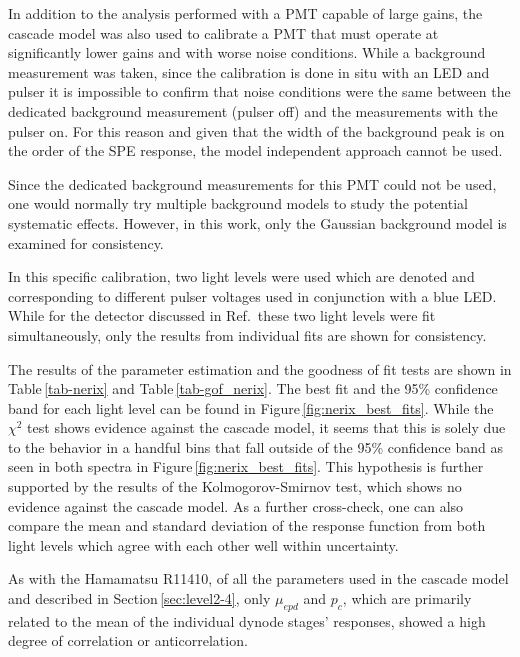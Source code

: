 \documentclass[11pt,a4paper]{article}
\newcommand\figref[1]{Figure\,\ref{#1}}
\newcommand\tabref[1]{Table\,\ref{#1}}
\newcommand\secref[1]{Section\,\ref{#1}}
\newcommand\citeref[1]{Ref.\,\cite{#1}}
\newcommand{\RNum}[1]{\uppercase\expandafter{\romannumeral #1\relax}}
\begin{document}
In addition to the analysis performed with a PMT capable of large gains, the cascade model was also used to calibrate a PMT that must operate at significantly lower gains and with worse noise conditions.  While a background measurement was taken, since the calibration is done in situ with an LED and pulser it is impossible to confirm that noise conditions were the same between the dedicated background measurement (pulser off) and the measurements with the pulser on.  For this reason and given that the width of the background peak is on the order of the SPE response, the model independent approach cannot be used.  





Since the dedicated background measurements for this PMT could not be used, one would normally try multiple background models to study the potential systematic effects.  However, in this work, only the Gaussian background model is examined for consistency.

In this specific calibration, two light levels were used which are denoted \RNum{1} and \RNum{2} corresponding to different pulser voltages used in conjunction with a blue LED.  While for the detector discussed in \citeref{goetzke} these two light levels were fit simultaneously, only the results from individual fits are shown for consistency.

The results of the parameter estimation and the goodness of fit tests are shown in \tabref{tab-nerix} and \tabref{tab-gof_nerix}.  The best fit and the 95\% confidence band for each light level can be found in \figref{fig:nerix_best_fits}.  While the $\chi^2$ test shows evidence against the cascade model, it seems that this is solely due to the behavior in a handful bins that fall outside of the 95\% confidence band as seen in both spectra in \figref{fig:nerix_best_fits}.  This hypothesis is further supported by the results of the Kolmogorov-Smirnov test, which shows no evidence against the cascade model.  As a further cross-check, one can also compare the mean and standard deviation of the response function from both light levels which agree with each other well within uncertainty.

As with the Hamamatsu R11410, of all the parameters used in the cascade model and  described in \secref{sec:level2-4}, only $\mu_{epd}$ and $p_c$, which are primarily related to the mean of the individual dynode stages' responses, showed a high degree of correlation or anticorrelation.
\end{document}
